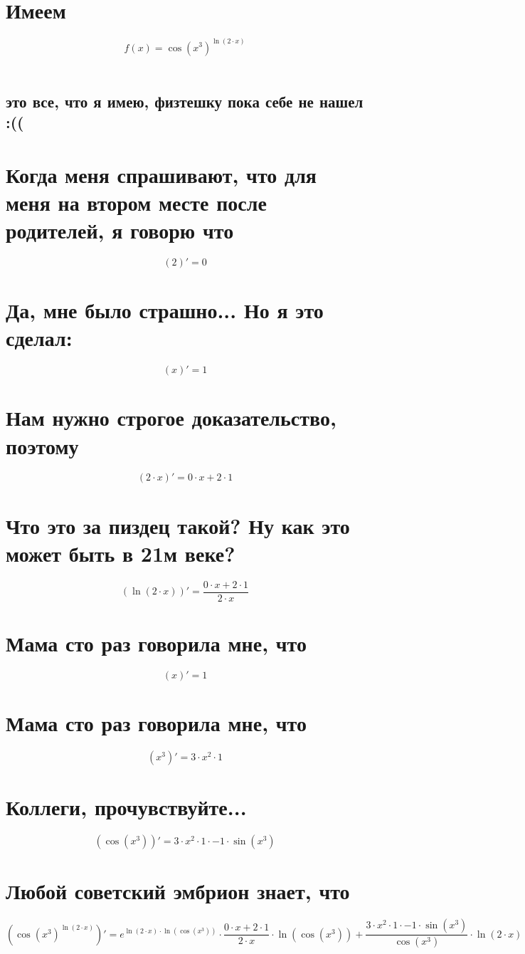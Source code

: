 \documentclass{article}
\begin{document}
\begin{Large}
\begin{onehalfspace}
\section*{Имеем}$$ f(x) = \cos(x^{3})^{\ln(2 \cdot x)}$$\\
\subsection*{это все, что я имею, физтешку пока себе не нашел :((}\section*{Когда меня спрашивают, что для меня на втором месте после родителей, я говорю что}
$$(2)' = 0$$
\section*{Да, мне было страшно... Но я это сделал:}
$$(x)' = 1$$
\section*{Нам нужно строгое доказательство, поэтому}
$$(2 \cdot x)' = 0 \cdot x + 2 \cdot 1$$
\section*{Что это за пиздец такой? Ну как это может быть в 21м веке?}
$$(\ln(2 \cdot x))' = \frac{0 \cdot x + 2 \cdot 1}{2 \cdot x}$$
\section*{Мама сто раз говорила мне, что}
$$(x)' = 1$$
\section*{Мама сто раз говорила мне, что}
$$(x^{3})' = 3 \cdot x^{2} \cdot 1$$
\section*{Коллеги, прочувствуйте...}
$$(\cos(x^{3}))' = 3 \cdot x^{2} \cdot 1 \cdot -1 \cdot \sin(x^{3})$$
\section*{Любой советский эмбрион знает, что}
$$(\cos(x^{3})^{\ln(2 \cdot x)})' = e^{\ln(2 \cdot x) \cdot \ln(\cos(x^{3}))} \cdot \frac{0 \cdot x + 2 \cdot 1}{2 \cdot x} \cdot \ln(\cos(x^{3})) + \frac{3 \cdot x^{2} \cdot 1 \cdot -1 \cdot \sin(x^{3})}{\cos(x^{3})} \cdot \ln(2 \cdot x)$$
\hline \vspace{1cm} \\

\end{onehalfspace}
\end{Large}
\end{document}
